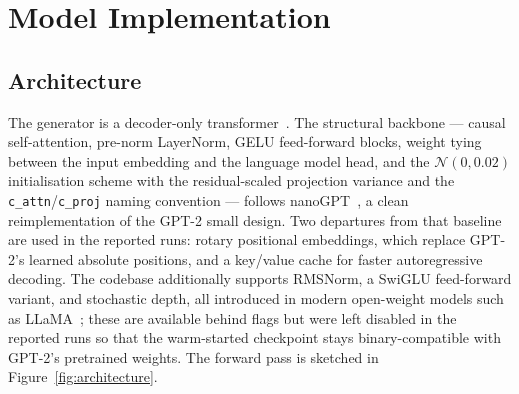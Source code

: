 \section{Model Implementation}
\label{sec:model}

\subsection{Architecture}

The generator is a decoder-only transformer~\cite{vaswani2017attention}. The structural
backbone --- causal self-attention, pre-norm LayerNorm, GELU feed-forward blocks, weight tying
between the input embedding and the language model head, and the $\mathcal{N}(0, 0.02)$
initialisation scheme with the residual-scaled projection variance \cite{radford2019gpt2}
and the \texttt{c\_attn}/\texttt{c\_proj} naming convention --- follows
nanoGPT~\cite{karpathy2022nanogpt}, a clean reimplementation of the GPT-2 small design.
Two departures from that baseline are used in the reported runs: rotary positional
embeddings, which replace GPT-2's learned absolute positions, and a key/value cache for
faster autoregressive decoding. The codebase additionally supports RMSNorm, a SwiGLU
feed-forward variant, and stochastic depth, all introduced in modern open-weight models
such as LLaMA~\cite{touvron2023llama}; these are available behind flags but were left
disabled in the reported runs so that the warm-started checkpoint stays binary-compatible
with GPT-2's pretrained weights. The forward pass is sketched in
Figure~\ref{fig:architecture}.

